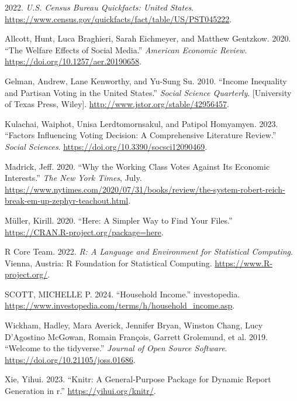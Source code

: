 \documentclass[
  letterpaper,
  DIV=11,
  numbers=noendperiod]{scrartcl}
\newlength{\cslhangindent}
\newenvironment{CSLReferences}[2] %
 {\begin{list}{}{%
  \setlength{\itemindent}{0pt}
  \setlength{\leftmargin}{0pt}
  \setlength{\parsep}{0pt}
  \ifodd #1
   \setlength{\leftmargin}{\cslhangindent}
   \setlength{\itemindent}{-1\cslhangindent}
  \fi
  \setlength{\itemsep}{#2\baselineskip}}}
 {\end{list}}
\begin{document}
\label{refs}
\begin{CSLReferences}{1}{0}
2022. \emph{U.S. Census Bureau Quickfacts: United States}.
\url{https://www.census.gov/quickfacts/fact/table/US/PST045222}.

Allcott, Hunt, Luca Braghieri, Sarah Eichmeyer, and Matthew Gentzkow.
2020. {``The Welfare Effects of Social Media.''} \emph{American Economic
Review}. \url{https://doi.org/10.1257/aer.20190658}.

Gelman, Andrew, Lane Kenworthy, and Yu-Sung Su. 2010. {``Income
Inequality and Partisan Voting in the United States.''} \emph{Social
Science Quarterly}. {[}University of Texas Press, Wiley{]}.
\url{http://www.jstor.org/stable/42956457}.

Kulachai, Waiphot, Unisa Lerdtomornsakul, and Patipol Homyamyen. 2023.
{``Factors Influencing Voting Decision: A Comprehensive Literature
Review.''} \emph{Social Sciences}.
\url{https://doi.org/10.3390/socsci12090469}.

Madrick, Jeff. 2020. {``Why the Working Class Votes Against Its Economic
Interests.''} \emph{The New York Times}, July.
\url{https://www.nytimes.com/2020/07/31/books/review/the-system-robert-reich-break-em-up-zephyr-teachout.html}.

Müller, Kirill. 2020. {``Here: A Simpler Way to Find Your Files.''}
\url{https://CRAN.R-project.org/package=here}.

R Core Team. 2022. \emph{R: A Language and Environment for Statistical
Computing}. Vienna, Austria: R Foundation for Statistical Computing.
\url{https://www.R-project.org/}.

SCOTT, MICHELLE P. 2024. {``Household Income.''} investopedia.
\url{https://www.investopedia.com/terms/h/household_income.asp}.

Wickham, Hadley, Mara Averick, Jennifer Bryan, Winston Chang, Lucy
D'Agostino McGowan, Romain François, Garrett Grolemund, et al. 2019.
{``Welcome to the {tidyverse}.''} \emph{Journal of Open Source
Software}. \url{https://doi.org/10.21105/joss.01686}.

Xie, Yihui. 2023. {``Knitr: A General-Purpose Package for Dynamic Report
Generation in r.''} \url{https://yihui.org/knitr/}.

\end{CSLReferences}
\end{document}
